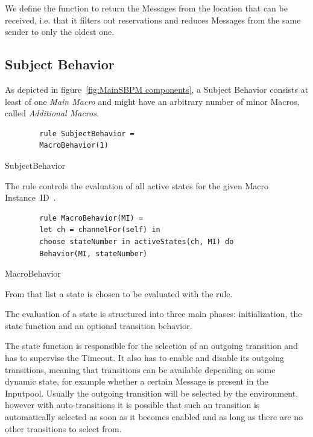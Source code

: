 We define the function  to return the
Messages from the location  that can be received, i.e. that it
filters out reservations and reduces Messages from the same sender to only
the oldest one.

\subsection{Subject Behavior}


As depicted in figure~\ref{fig:MainSBPM components}, a Subject Behavior consists at least of one \textit{Main Macro}
and might have an arbitrary number of minor Macros, called \textit{Additional Macros}.

\begin{listing}[H]
	\begin{verbatim}
		rule SubjectBehavior =
		MacroBehavior(1)
	\end{verbatim}
	\caption{SubjectBehavior}
	\label{lst:shortasm:SubjectBehavior}
\end{listing}




The  rule controls the evaluation of all active
states for the given Macro Instance~ID~.


\begin{listing}[H]
	\begin{verbatim}
		rule MacroBehavior(MI) =
		let ch = channelFor(self) in
		choose stateNumber in activeStates(ch, MI) do
		Behavior(MI, stateNumber)
	\end{verbatim}
	\caption{MacroBehavior}
	\label{lst:shortasm:MacroBehavior}
\end{listing}

From that list a state  is chosen to be evaluated with the  rule.



The evaluation of a state is structured into three main phases: initialization,
the state function and an optional transition behavior.

The state function is responsible for the selection of an outgoing transition and
has to supervise the Timeout. It also has to enable and disable its outgoing
transitions, meaning that transitions can be available depending on some dynamic state,
for example whether a certain Message is present in the Inputpool.
Usually the outgoing transition will be selected by the environment, however with
auto-transitions it is possible that such an transition is automatically selected as soon
as it becomes enabled and as long as there are no other transitions to select from.


